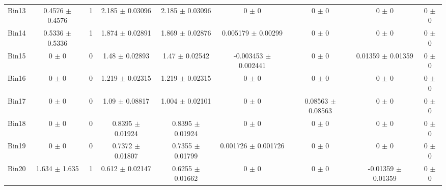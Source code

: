 \begin{tabular}{@{\extracolsep{4pt}}lcccccccc@{}}
     Bin13 & 0.4576 $\pm$ 0.4576 & 1 & 2.185 $\pm$ 0.03096 & 2.185 $\pm$ 0.03096 & 0 $\pm$ 0 & 0 $\pm$ 0 & 0 $\pm$ 0 & 0 $\pm$ 0 \\ 
     Bin14 & 0.5336 $\pm$ 0.5336 & 1 & 1.874 $\pm$ 0.02891 & 1.869 $\pm$ 0.02876 & 0.005179 $\pm$ 0.00299 & 0 $\pm$ 0 & 0 $\pm$ 0 & 0 $\pm$ 0 \\ 
     Bin15 & 0 $\pm$ 0 & 0 & 1.48 $\pm$ 0.02893 & 1.47 $\pm$ 0.02542 & -0.003453 $\pm$ 0.002441 & 0 $\pm$ 0 & 0.01359 $\pm$ 0.01359 & 0 $\pm$ 0 \\ 
     Bin16 & 0 $\pm$ 0 & 0 & 1.219 $\pm$ 0.02315 & 1.219 $\pm$ 0.02315 & 0 $\pm$ 0 & 0 $\pm$ 0 & 0 $\pm$ 0 & 0 $\pm$ 0 \\ 
     Bin17 & 0 $\pm$ 0 & 0 & 1.09 $\pm$ 0.08817 & 1.004 $\pm$ 0.02101 & 0 $\pm$ 0 & 0.08563 $\pm$ 0.08563 & 0 $\pm$ 0 & 0 $\pm$ 0 \\ 
     Bin18 & 0 $\pm$ 0 & 0 & 0.8395 $\pm$ 0.01924 & 0.8395 $\pm$ 0.01924 & 0 $\pm$ 0 & 0 $\pm$ 0 & 0 $\pm$ 0 & 0 $\pm$ 0 \\ 
     Bin19 & 0 $\pm$ 0 & 0 & 0.7372 $\pm$ 0.01807 & 0.7355 $\pm$ 0.01799 & 0.001726 $\pm$ 0.001726 & 0 $\pm$ 0 & 0 $\pm$ 0 & 0 $\pm$ 0 \\ 
     Bin20 & 1.634 $\pm$ 1.635 & 1 & 0.612 $\pm$ 0.02147 & 0.6255 $\pm$ 0.01662 & 0 $\pm$ 0 & 0 $\pm$ 0 & -0.01359 $\pm$ 0.01359 & 0 $\pm$ 0 \\ 
\hline\hline
  \end{tabular}
